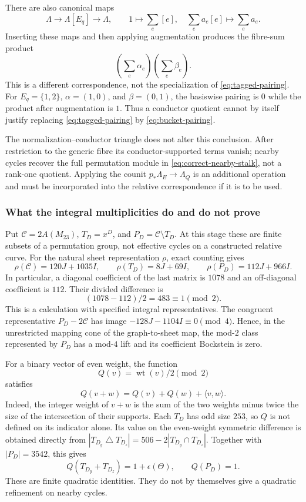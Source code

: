 \documentclass[11pt]{amsart}
\theoremstyle{definition}
\theoremstyle{remark}
\begin{document}
There are also canonical maps
\[
 \Lambda\longrightarrow\Lambda[E_q]\longrightarrow\Lambda,
 \qquad
 1\longmapsto\sum_e[e],\quad
 \sum_e a_e[e]\longmapsto\sum_ea_e.
\]
Inserting these maps and then applying augmentation produces the fibre-sum
product
\begin{equation}
 \left(\sum_e\alpha_e\right)\left(\sum_e\beta_e\right).
\label{eq:bucket-pairing}
\end{equation}
This is a different correspondence, not the specialization of
\eqref{eq:tagged-pairing}.  For $E_q=\{1,2\}$,
$\alpha=(1,0)$, and $\beta=(0,1)$, the basiswise pairing is $0$ while the
product after augmentation is $1$.  Thus a conductor quotient cannot by itself justify
replacing \eqref{eq:tagged-pairing} by \eqref{eq:bucket-pairing}.

The normalization--conductor triangle does not alter this conclusion.
After restriction to the generic fibre its conductor-supported terms vanish;
nearby cycles recover the full permutation module in
\eqref{eq:correct-nearby-stalk}, not a rank-one quotient.  Applying the
counit $p_*\Lambda_E\to\Lambda_Q$ is an additional operation and must be
incorporated into the relative correspondence if it is to be used.

\subsubsection{What the integral multiplicities do and do not prove}

Put $\mathcal C=2A(M_{23})$, $T_D=x^D$, and
$P_D=\mathcal C\setminus T_D$.  At this stage these are finite subsets
of a permutation group, not effective cycles on a constructed relative
curve.  For the natural sheet representation $\rho$, exact counting gives
\[
 \rho(\mathcal C)=120J+1035I,\qquad
 \rho(T_D)=8J+69I,\qquad
 \rho(P_D)=112J+966I.
\]
In particular, a diagonal coefficient of the last matrix is $1078$
and an off-diagonal coefficient is $112$.  Their divided difference is
\[
 (1078-112)/2=483\equiv1\pmod2.
\]
This is a calculation with specified integral representatives.  The
congruent representative $P_D-2\mathcal C$ has image
$-128J-1104I\equiv0\pmod4$.  Hence, in the unrestricted mapping cone of
the graph-to-sheet map, the mod-$2$ class represented by $P_D$ has a
mod-$4$ lift and its coefficient Bockstein is zero.

For a binary vector of even weight, the function
\[
 Q(v)=\operatorname{wt}(v)/2\pmod2
\]
satisfies
\[
 Q(v+w)=Q(v)+Q(w)+\langle v,w\rangle.
\]
Indeed, the integer weight of $v+w$ is the sum of the two weights minus
twice the size of the intersection of their supports.  Each $T_D$ has
odd size $253$, so $Q$ is not defined on its indicator alone.  Its value
on the even-weight symmetric difference is obtained directly from
$|T_{D_y}\mathbin{\triangle}T_{D_z}|=506-2|T_{D_y}\cap T_{D_z}|$.
Together with $|P_D|=3542$, this gives
\[
 Q(T_{D_y}+T_{D_z})=1+\epsilon(\Theta),\qquad Q(P_D)=1.
\]
These are finite quadratic identities.  They do not by themselves give a
quadratic refinement on nearby cycles.
\end{document}
